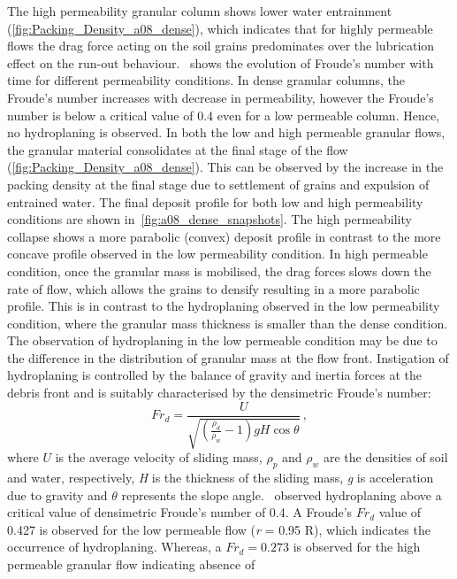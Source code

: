 The high permeability granular column shows lower water entrainment 
(\cref{fig:Packing_Density_a08_dense}), which indicates that for highly 
permeable flows the drag force acting on the soil grains predominates over the 
lubrication effect on the run-out behaviour.~ shows the 
evolution of Froude's number with time for different permeability conditions. 
In dense granular columns, the Froude's number increases with decrease in 
permeability, however the Froude's number is below a critical value of 0.4 even 
for a low permeable column. Hence, no hydroplaning is observed. In both the low 
and high permeable granular flows, the granular material consolidates at the 
final stage of the flow (\cref{fig:Packing_Density_a08_dense}). This can be 
observed by the increase in the packing density at the final stage due to 
settlement of grains and expulsion of entrained water. The final deposit 
profile for both low and high permeability conditions are shown 
in~\cref{fig:a08_dense_snapshots}. The high permeability collapse shows a more 
parabolic (convex) deposit profile in contrast to the more concave profile 
observed in the low permeability condition. In high permeable condition, once 
the granular mass is mobilised, the drag forces slows down the rate of flow, 
which allows the grains to densify resulting in a more parabolic profile. This 
is in contrast to the hydroplaning observed in the low permeability condition, 
where the granular mass thickness is smaller than the dense condition. The 
observation of hydroplaning in the low permeable condition may be due to the 
difference in the distribution of granular mass at the flow front. Instigation 
of hydroplaning is controlled by the balance of gravity and inertia forces at 
the debris front and is suitably characterised by the densimetric Froude's 
number:
%
\begin{equation}
Fr_d = \frac{U}{\sqrt{(\frac{\rho_d}{\rho_w}-1)gH\cos\theta}} \,,
\end{equation}
where $U$ is the average velocity of sliding mass, $\rho_p$ and $\rho_w$ are 
the densities of soil and water, respectively, \textit{H} is the thickness of 
the sliding mass, \textit{g} is acceleration due to gravity and $\theta$ 
represents the slope angle.~\citet{Harbitz2003} observed 
hydroplaning above a critical value of densimetric Froude's number of 0.4. A 
Froude's $Fr_d$ value of 0.427 is observed for the low permeable flow 
(\textit{r} = 0.95 
R), which indicates the occurrence of hydroplaning. Whereas, a $Fr_d = 0.273$ 
is observed for the high permeable granular flow indicating absence of 
